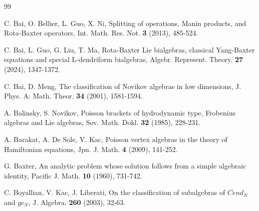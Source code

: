 \documentclass[12pt]{amsart}
\begin{document}
\begin{thebibliography}{99}


C. Bai, O. Bellier, L. Guo, X. Ni, Splitting of operations, Manin
products, and Rota-Baxter operators, Int. Math. Res. Not. {\bf3}
(2013), 485-524.




 C. Bai, L. Guo, G. Liu, T. Ma, Rota-Baxter Lie bialgebras, classical Yang-Baxter equations and special L-dendriform bialgebras, Algebr. Represent. Theory. {\bf 27} (2024), 1347-1372.



C. Bai, D. Meng, The classification of Novikov algebras in low
dimensions, J. Phys. A: Math. Theor. {\bf 34} (2001), 1581-1594.



A. Balinsky, S. Novikov, Poisson brackets of hydrodynamic type,
Frobenius algebras and Lie algebras, Sov. Math. Dokl. {\bf32}
(1985), 228-231.


A. Barakat, A. De Sole, V. Kac, Poisson vertex algebras in the
theory of Hamiltonian equations, Jpn. J. Math. {\bf 4} (2009),
141-252.


G. Baxter,  An analytic problem whose solution follows from a
simple algebraic identity, Pacific J. Math. {\bf 10} (1960),
731-742.



C. Boyallian, V. Kac, J. Liberati, On the classification of
subalgebras of $Cend_N$ and $gc_N$,  J. Algebra. {\bf 260} (2003),
32-63.


\end{thebibliography}
\end{document}
